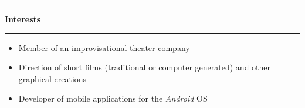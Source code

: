 \documentclass[a4paper,11pt]{article} %
\newcommand{\trad}[2]{#1}
\newcommand{\titre}[1]{%
	\begin{center}
	\rule{\textwidth}{1pt}
	\par
	\vspace{0.1cm}
        \textbf{\large #1}
	\par\rule{\textwidth}{1pt}
	\end{center}
	}
\begin{document}
\titre{\trad{Interests}{Centres d'Intérêts}}


	\begin{itemize}
	\item \trad{Member of an improvisational theater company}                   								{Membre d'une troupe d'improvisation théatrale}
	\item \trad{Direction of short films (traditional or computer generated) and other graphical creations}   	{Réalisation de courts métrages et autres créations graphiques} %
	\item \trad{Developer of mobile applications for the \textit{Android} OS}  									{Développement d'applications pour mobiles \textit{Android}}
	\end{itemize}

	

\end{document}
